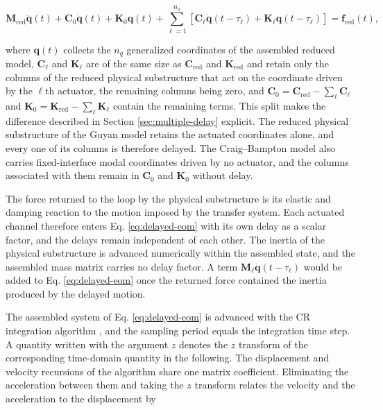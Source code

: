 \documentclass[a4paper,fleqn,review,12pt]{cas-sc}
\numberwithin{equation}{section}
\begin{document}
\vspace{-3.5em}
\begin{equation}
	\mathbf{M}_{\mathrm{red}}\ddot{\bm{q}}(t)+\mathbf{C}_{0}\dot{\bm{q}}(t)+\mathbf{K}_{0}\bm{q}(t)
	+\sum_{\ell=1}^{n_{\mathrm{a}}}
	\left[
	\mathbf{C}_{\ell}\dot{\bm{q}}(t-\tau_{\ell})
	+\mathbf{K}_{\ell}\bm{q}(t-\tau_{\ell})
	\right]
	=\bm{f}_{\mathrm{red}}(t),
	\label{eq:delayed-eom}
\end{equation}
\vspace{-3.5em}

\noindent where \(\bm{q}(t)\) collects the \(n_{q}\) generalized coordinates of the assembled reduced model, \(\mathbf{C}_{\ell}\) and \(\mathbf{K}_{\ell}\) are of the same size as \(\mathbf{C}_{\mathrm{red}}\) and \(\mathbf{K}_{\mathrm{red}}\) and retain only the columns of the reduced physical substructure that act on the coordinate driven by the \(\ell\)th actuator, the remaining columns being zero, and \(\mathbf{C}_{0}=\mathbf{C}_{\mathrm{red}}-\sum_{\ell}\mathbf{C}_{\ell}\) and \(\mathbf{K}_{0}=\mathbf{K}_{\mathrm{red}}-\sum_{\ell}\mathbf{K}_{\ell}\) contain the remaining terms. This split makes the difference described in Section \ref{sec:multiple-delay} explicit. The reduced physical substructure of the Guyan model retains the actuated coordinates alone, and every one of its columns is therefore delayed. The Craig--Bampton model also carries fixed-interface modal coordinates driven by no actuator, and the columns associated with them remain in \(\mathbf{C}_{0}\) and \(\mathbf{K}_{0}\) without delay.

The force returned to the loop by the physical substructure is its elastic and damping reaction to the motion imposed by the transfer system. Each actuated channel therefore enters Eq. \eqref{eq:delayed-eom} with its own delay as a scalar factor, and the delays remain independent of each other. The inertia of the physical substructure is advanced numerically within the assembled state, and the assembled mass matrix carries no delay factor. A term \(\mathbf{M}_{\ell}\ddot{\bm{q}}(t-\tau_{\ell})\) would be added to Eq. \eqref{eq:delayed-eom} once the returned force contained the inertia produced by the delayed motion.

The assembled system of Eq. \eqref{eq:delayed-eom} is advanced with the CR integration algorithm \cite{ChenRicles2008b}, and the sampling period equals the integration time step. A quantity written with the argument \(z\) denotes the \(z\) transform of the corresponding time-domain quantity in the following. The displacement and velocity recursions of the algorithm share one matrix coefficient. Eliminating the acceleration between them and taking the \(z\) transform relates the velocity and the acceleration to the displacement by
\end{document}
